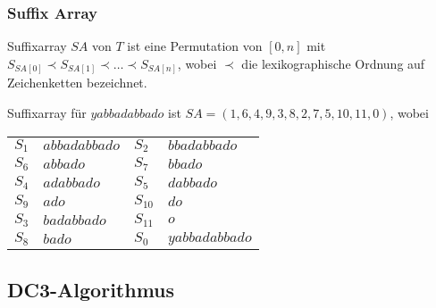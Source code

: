 \documentclass{beamer}
\begin{document}
\begin{frame}[fragile]
\frametitle{Suffix Array}
\begin{definition}
Suffixarray $SA$ von $T$ ist eine Permutation von $[0,n]$ mit $S_{SA[0]} \prec S_{SA[1]} \prec \dots \prec S_{SA[n]}$, wobei $\prec$ die lexikographische Ordnung auf Zeichenketten bezeichnet.
\end{definition}
\begin{example}
Suffixarray für $yabbadabbado$ ist $SA = (1, 6, 4, 9, 3, 8, 2, 7, 5, 10, 11, 0)$, wobei
\begin{table}
\begin{tabular}{l l|l l}
    \toprule
    $S_1$       & $a b b a d a b b a d o$ & $S_2$    & $b b a d a b b a d o$     \\
    $S_6$       & $a b b a d o$           & $S_7$    & $b b a d o$               \\
    $S_4$       & $a d a b b a d o$       & $S_5$    & $d a b b a d o$           \\
    $S_9$       & $a d o$                 & $S_{10}$ & $d o$                     \\
    $S_3$       & $b a d a b b a d o$     & $S_{11}$ & $o$                       \\
    $S_8$       & $b a d o$               & $S_0$    & $y a b b a d a b b a d o$ \\
    \bottomrule
\end{tabular}
\end{table}
\end{example}
\end{frame}

\subsection{DC3-Algorithmus}

\frame{\subsectionpage}
\end{document}
